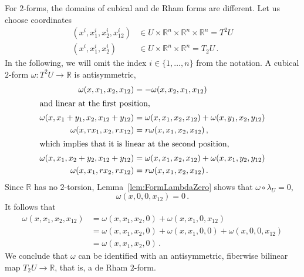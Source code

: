 \documentclass[12pt,reqno, a4paper]{amsart}
\numberwithin{equation}{section}
\theoremstyle{plain}
\theoremstyle{definition}
\theoremstyle{remark}
\newcommand{\bbR}{\mathbb{R}}
\begin{document}
For $2$-forms, the domains of cubical and de Rham forms are different. Let us choose coordinates
\begin{align*}
  (x^i, x_1^i, x_2^i, x_{12}^i)
  &\in
  U \times \bbR^n \times \bbR^n \times \bbR^n
  = T^2 U
  \\
  (x^i, x_1^i, x_2^i)
  &\in
  U \times \bbR^n \times \bbR^n
  = T_2 U
  \,.
\end{align*}
In the following, we will omit the index $i \in \{1, \ldots, n\}$ from the notation. A cubical $2$-form $\omega: T^2 U \to \bbR$ is antisymmetric,
\begin{align*}
  \omega(x, x_1, x_2, x_{12})
  &= - \omega(x, x_2, x_1, x_{12})
  \\
\intertext{and linear at the first position,}
  \omega(x, x_1 + y_1, x_2, x_{12} + y_{12})
  &=  \omega(x, x_1, x_2, x_{12})
    + \omega(x, y_1, x_2, y_{12})
  \\
  \omega(x, r x_1, x_2, r x_{12})
  &= r \omega(x, x_1, x_2, x_{12})
  \,,
  \\
\intertext{which implies that it is linear at the second position,}
  \omega(x, x_1, x_2 + y_2, x_{12} + y_{12})
  &=  \omega(x, x_1, x_2, x_{12})
    + \omega(x, x_1, y_2, y_{12})
  \\
  \omega(x, x_1, r x_2, r x_{12})
  &= r \omega(x, x_1, x_2, x_{12})
  \,.
\end{align*}
Since $\bbR$ has no $2$-torsion, Lemma~\ref{lem:FormLambdaZero} shows that $\omega \circ \lambda_U = 0$,
\begin{equation*}
  \omega(x,0,0,x_{12}) = 0
  \,.
\end{equation*}
It follows that
\begin{equation*}
\begin{split}
  \omega(x,x_1,x_2,x_{12})
  &= \omega(x,x_1,x_2,0) + \omega(x,x_1,0,x_{12})
  \\
  &= \omega(x,x_1,x_2,0) + \omega(x,x_1,0,0) + \omega(x,0,0,x_{12})
  \\
  &= \omega(x,x_1,x_2,0)
  \,.
\end{split}
\end{equation*}
We conclude that $\omega$ can be identified with an antisymmetric, fiberwise bilinear map $T_2 U \to \bbR$, that is, a de Rham $2$-form.
\end{document}

